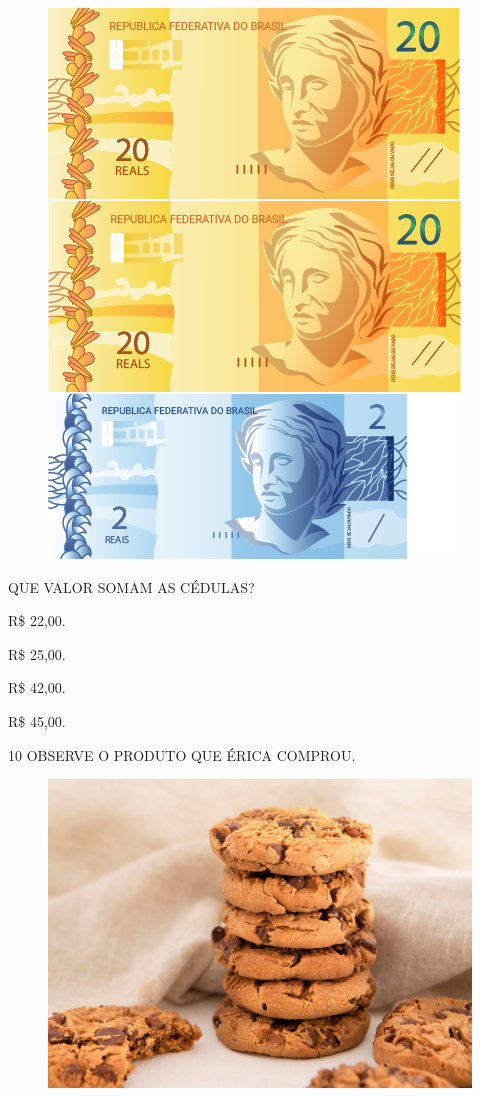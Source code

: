 \begin{figure}[H]
\centering
\includegraphics[width=.5\textwidth]{./media/SAEB_1ANO_MAT_FIGURA117b.png}
\end{figure}

QUE VALOR SOMAM AS CÉDULAS?

\begin{escolha}
\item R\$ 22,00.

\item R\$ 25,00.

\item R\$ 42,00.

\item R\$ 45,00.
\end{escolha}

\pagebreak
\num{10} OBSERVE O PRODUTO QUE ÉRICA COMPROU.

\begin{figure}[H]
\includegraphics[width=\textwidth]{media/image116.png}
\end{figure}

